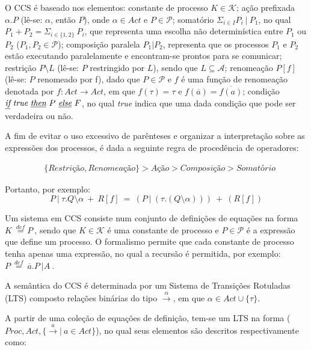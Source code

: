 O CCS é baseado nos elementos: constante de processo $K \in \mathcal{K}$; ação prefixada $\alpha.P$ (lê-se: $\alpha$, então $P$), onde $\alpha \in Act$ e $P \in \mathcal{P}$; somatório $\Sigma_{i\in I} P_{i}~|~P_{1}$, no qual $P_{1} + P_{2} = \Sigma_{i\in \{1,2\}}~P_{i}$, que representa uma escolha não determinística entre $P_{1}$ ou $P_{2}$ ($P_{1}, P_{2} \in \mathcal{P}$); composição paralela $P_{1} | P_{2}$, representa que os processos $P_{1}$ e $P_{2}$ estão executando paralelamente e encontram-se prontos para se comunicar; restrição $P \setminus L$ (lê-se: $P$ restringido por $L$), sendo que $L \subseteq \mathcal{A}$; renomeação $P[f]$ (lê-se: $P$ renomeado por f), dado que $P \in \mathcal{P}$ e $f$ é uma função de renomeação denotada por $f : Act \longrightarrow Act$, em que $f(\tau) = \tau$ e $f(\overline{a}) = \overline{f(a)}$; condição $\textit{\underline{if}}~\textit{true}~\textit{\underline{then}}~P~\textit{\underline{else}}~F$, no qual \textit{true} indica que uma dada condição que pode ser verdadeira ou não.    

A fim de evitar o uso excessivo de parênteses e organizar a interpretação sobre as expressões dos processos, é dada a seguinte regra de procedência de operadores:

\begin{align*}
 &\{Restrição, Renomeação\} > Ação > Composição > Somatório
\end{align*}

Portanto, por exemplo:
\begin{equation}
P~|~\tau.Q\setminus\alpha~+~R[f]~=~(P~|~(\tau.(Q\setminus\alpha)))~+~(R[f]) 
\end{equation}

Um sistema em CCS consiste num conjunto de definições de equações na forma $K~\stackrel{def}{=}P~$, sendo que $K \in \mathcal{K}$ é uma constante de processo e $P \in \mathcal{P}$ é a expressão que define um processo. O formalismo permite que cada constante de processo tenha apenas uma expressão, no qual a recursão é permitida, por exemplo: $P~\stackrel{def}{=}~\overline{a}.P~|A~$.

A semântica do CCS é determinada por um Sistema de Transições Rotuladas (LTS) composto relações binárias do tipo $\stackrel{\alpha}{\longrightarrow}$, em que $\alpha \in Act\cup\{\tau\}$.

A partir de uma coleção de equações de definição, tem-se um LTS na forma ($Proc, Act, \{\stackrel{a}{\longrightarrow}|~a \in Act\}$), no qual seus elementos são descritos respectivamente como:

